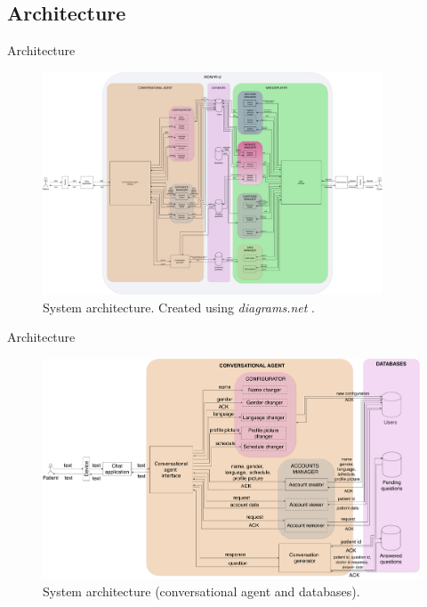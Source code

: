 \documentclass{beamer}
\begin{document}
\subsection{Architecture}
\begin{frame}[fragile]{Architecture}
\begin{figure}[H]
    \includegraphics[width=0.9\textwidth]{architecture.pdf}
    \caption{System architecture. Created using \emph{diagrams.net} \protect\cite{drawio}.}
\end{figure}
\end{frame}

\begin{frame}[fragile]{Architecture}
\begin{figure}[H]
    \includegraphics[width=\textwidth]{conv_agent.pdf}
    \caption{System architecture (conversational agent and databases).}
\end{figure}
\end{frame}
\end{document}

